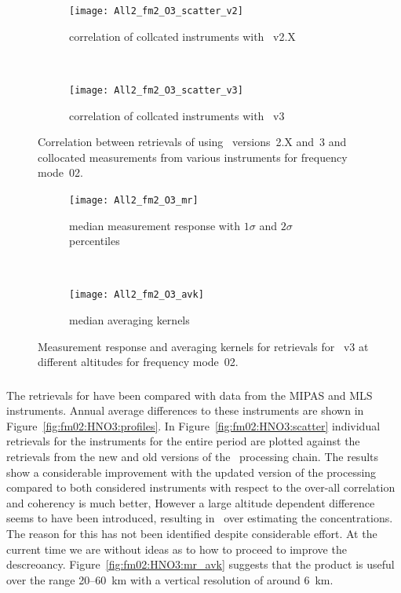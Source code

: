 \begin{figure}[tbhp]
    \centering
    \begin{subfigure}[b]{0.49\textwidth}
        \texttt{[image: All2\_fm2\_O3\_scatter\_v2]}
        \caption{correlation of collcated instruments with \smr~v2.X}
        \label{fig:fm02:O3:scatter:v2}
    \end{subfigure}
    \,
    \begin{subfigure}[b]{0.49\textwidth}
        \texttt{[image: All2\_fm2\_O3\_scatter\_v3]}
        \caption{correlation of collcated instruments with \smr~v3}
        \label{fig:fm02:O3:scatter:v3}
    \end{subfigure}
    \caption{Correlation between retrievals of  using \smr\
    versions~2.X and~3 and collocated measurements from various instruments
    for frequency mode~02.}
    \label{fig:fm02:O3:scatter}
\end{figure}

\begin{figure}[tbhp]
    \centering
    \begin{subfigure}[b]{0.49\textwidth}
        \texttt{[image: All2\_fm2\_O3\_mr]}
        \caption{median measurement response with $1\sigma$ and $2\sigma$
        percentiles}
        \label{fig:fm02:O3:mr}
    \end{subfigure}
    \,
    \begin{subfigure}[b]{0.49\textwidth}
        \texttt{[image: All2\_fm2\_O3\_avk]}
        \caption{median averaging kernels\newline~}
        \label{fig:fm02:O3:avk}
    \end{subfigure}
    \caption{Measurement response and averaging kernels for 
    retrievals for \smr~v3 at different altitudes for frequency mode~02.}
    \label{fig:fm02:O3:mr_avk}
\end{figure}



\subsubsection{}
\label{sec:fm02:comparison:HNO3} The retrievals for  have been
compared with data from the MIPAS and MLS instruments. Annual average
differences to these instruments are shown in
Figure~\ref{fig:fm02:HNO3:profiles}. In Figure~\ref{fig:fm02:HNO3:scatter}
individual retrievals for the instruments for the entire period are plotted
against the retrievals from the new and old versions of the \smr\ processing
chain. The results show a considerable improvement with the updated version of
the processing compared to both considered instruments with respect to the
over-all correlation and coherency is much better, However a large altitude
dependent difference seems to have been introduced, resulting in \smr\ over
estimating the concentrations. The reason for this has not been identified despite considerable 
effort. At the current time we are without ideas as to how to proceed to improve the descreoancy.
Figure~\ref{fig:fm02:HNO3:mr_avk} suggests that the product is useful over the
range 20--60~km with a vertical resolution of around 6~km.

